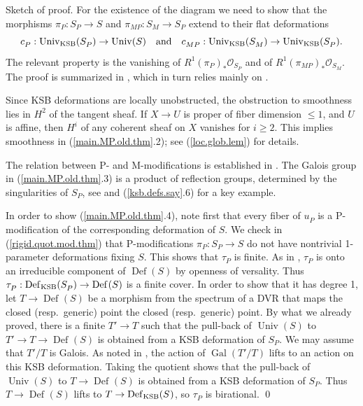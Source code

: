 \documentclass{amsart}
\theoremstyle{definition}
\theoremstyle{remark}
\renewcommand{\o}[0]{{\mathcal O}}
\newcommand{\qtq}[1]{\quad\mbox{#1}\quad}
\newcommand{\gal}[0]{\operatorname{Gal}}
\newcommand{\univ}[0]{\operatorname{Univ}}
\newcommand{\defsp}[0]{\operatorname{Def}}
\begin{document}
Sketch of proof. For the existence of the diagram we need to show that the
morphisms  $\pi_{P}:S^{}_P\to S$   and
$\pi_{MP}:S^{}_M\to S^{}_P$ extend to
their flat deformations
$$
c^{}_{P}:  \univ_{\rm KSB} (S^{}_P)\to \univ (S)
\qtq{and}
c^{}_{MP}: \univ_{\rm KSB} (S^{}_M) \to \univ_{\rm KSB} (S^{}_P).
$$
The relevant property is the vanishing of
$R^1(\pi_{P})_*\o_{S^{}_P}$ and of $R^1(\pi_{MP})_*\o_{S^{}_M}$. 
The proof is summarized in \cite[11.4]{km-flips}, which in turn relies mainly
on \cite{MR54:10261}. 


Since KSB deformations are locally unobstructed, the obstruction to smoothness lies in $H^2$ of the tangent sheaf. If $X\to U$ is proper of fiber dimension $\leq 1$, and $U$ is affine, then $H^i$ of any coherent  sheaf on $X$ vanishes for $i\geq 2$. This implies smoothness in (\ref{main.MP.old.thm}.2); see (\ref{loc.glob.lem}) for details.

The relation between
P- and M-modifications is established in \cite{be-ch}.
The Galois group in  (\ref{main.MP.old.thm}.3) is a product of reflection groups, determined by the singularities of $S^{}_P$, see \cite{be-ch} and (\ref{ksb.defs.say}.6) for a key example.



In order to show (\ref{main.MP.old.thm}.4), note first that 
every fiber of $u^{}_P$ is a P-modification of the corresponding deformation of $S$. We check in   (\ref{rigid.quot.mod.thm}) that P-modifications $\pi_{P}:S^{}_P\to S$ do not have nontrivial 1-parameter deformations fixing $S$.
This shows that  $\tau^{}_{P}$ is finite.
As in \cite{art-bri},  $\tau^{}_{P}$
    is  onto an irreducible component of $\defsp(S)$
    by openness of versality.
Thus $\tau^{}_{P}: \defsp_{\rm KSB}(S^{}_P) \to \defsp^{}(S)$
is a finite cover. In order to show that it has degree 1, let
$T\to \defsp^{}(S)$ be a morphism from the spectrum of a DVR that maps the closed (resp.\ generic) point  the closed (resp.\ generic) point.
By what we already proved, there is a finite $T'\to T$ such that the pull-back of $\univ(S)$ to $T'\to T\to \defsp^{}(S)$ is obtained from a KSB deformation of  $S^{}_P$. We may assume that $T'/T$ is Galois. As noted in \cite[p.312]{ksb}, 
the action of $\gal(T'/T)$ lifts to an action on this KSB deformation.
Taking the quotient shows that the pull-back of $\univ(S)$ to $T\to \defsp^{}(S)$ is obtained from a KSB deformation of  $S^{}_P$. Thus
$T\to \defsp^{}(S)$ lifts to $T\to \defsp_{\rm KSB}(S^{})$, so
  $\tau^{}_{P}$ is birational. \qed
    
    
    
\end{document}
